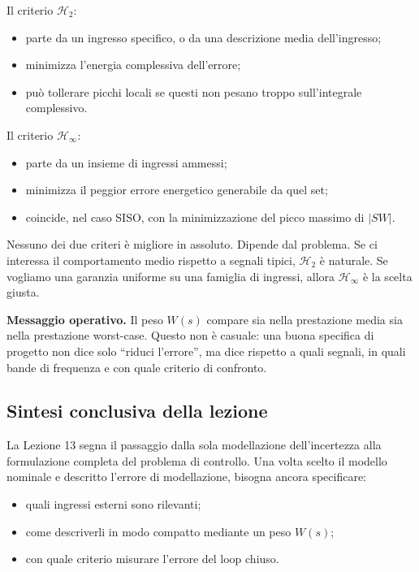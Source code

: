\documentclass[11pt,a4paper]{article}
\begin{document}
Il criterio $\mathcal{H}_2$:
\begin{itemize}
    \item parte da un ingresso specifico, o da una descrizione media dell'ingresso;
    \item minimizza l'energia complessiva dell'errore;
    \item pu\`o tollerare picchi locali se questi non pesano troppo sull'integrale complessivo.
\end{itemize}

Il criterio $\mathcal{H}_\infty$:
\begin{itemize}
    \item parte da un insieme di ingressi ammessi;
    \item minimizza il peggior errore energetico generabile da quel set;
    \item coincide, nel caso SISO, con la minimizzazione del picco massimo di $|SW|$.
\end{itemize}

Nessuno dei due criteri \`e migliore in assoluto. Dipende dal problema. Se ci interessa il comportamento medio rispetto a segnali tipici, $\mathcal{H}_2$ \`e naturale. Se vogliamo una garanzia uniforme su una famiglia di ingressi, allora $\mathcal{H}_\infty$ \`e la scelta giusta.

\begin{keybox}
\textbf{Messaggio operativo.} Il peso $W(s)$ compare sia nella prestazione media sia nella prestazione worst-case. Questo non \`e casuale: una buona specifica di progetto non dice solo ``riduci l'errore'', ma dice rispetto a quali segnali, in quali bande di frequenza e con quale criterio di confronto.
\end{keybox}

\subsection{Sintesi conclusiva della lezione}

La Lezione 13 segna il passaggio dalla sola modellazione dell'incertezza alla formulazione completa del problema di controllo. Una volta scelto il modello nominale e descritto l'errore di modellazione, bisogna ancora specificare:
\begin{itemize}
    \item quali ingressi esterni sono rilevanti;
    \item come descriverli in modo compatto mediante un peso $W(s)$;
    \item con quale criterio misurare l'errore del loop chiuso.
\end{itemize}
\end{document}
